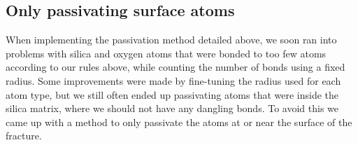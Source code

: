 
\subsection{Only passivating surface atoms}
When implementing the passivation method detailed above, we soon ran into problems with silica and oxygen atoms that were bonded to too few atoms according to our rules above, while counting the number of bonds using a fixed radius. Some improvements were made by fine-tuning the radius used for each atom type, but we still often ended up passivating atoms that were inside the silica matrix, where we should not have any dangling bonds. To avoid this we came up with a method to only passivate the atoms at or near the surface of the fracture.

